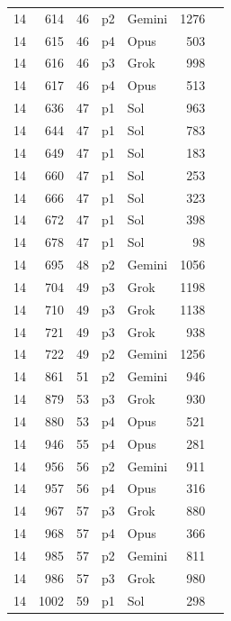 \begin{longtable}{r r r l l r L{2.2in}}
14 & 614 & 46 & p2 & Gemini & 1276 &  \\
14 & 615 & 46 & p4 & Opus & 503 &  \\
14 & 616 & 46 & p3 & Grok & 998 &  \\
14 & 617 & 46 & p4 & Opus & 513 &  \\
14 & 636 & 47 & p1 & Sol & 963 &  \\
14 & 644 & 47 & p1 & Sol & 783 &  \\
14 & 649 & 47 & p1 & Sol & 183 &  \\
14 & 660 & 47 & p1 & Sol & 253 &  \\
14 & 666 & 47 & p1 & Sol & 323 &  \\
14 & 672 & 47 & p1 & Sol & 398 &  \\
14 & 678 & 47 & p1 & Sol & 98 &  \\
14 & 695 & 48 & p2 & Gemini & 1056 &  \\
14 & 704 & 49 & p3 & Grok & 1198 &  \\
14 & 710 & 49 & p3 & Grok & 1138 &  \\
14 & 721 & 49 & p3 & Grok & 938 &  \\
14 & 722 & 49 & p2 & Gemini & 1256 &  \\
14 & 861 & 51 & p2 & Gemini & 946 &  \\
14 & 879 & 53 & p3 & Grok & 930 &  \\
14 & 880 & 53 & p4 & Opus & 521 &  \\
14 & 946 & 55 & p4 & Opus & 281 &  \\
14 & 956 & 56 & p2 & Gemini & 911 &  \\
14 & 957 & 56 & p4 & Opus & 316 &  \\
14 & 967 & 57 & p3 & Grok & 880 &  \\
14 & 968 & 57 & p4 & Opus & 366 &  \\
14 & 985 & 57 & p2 & Gemini & 811 &  \\
14 & 986 & 57 & p3 & Grok & 980 &  \\
14 & 1002 & 59 & p1 & Sol & 298 &  \\

\end{longtable}

